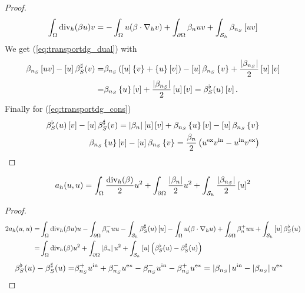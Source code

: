 \begin{proof}
%
\begin{align*}
\int_{\Omega}\operatorname{div}_h(\beta u) v = - \int_{\Omega}u (\beta\cdot\nabla_h v) + \int_{\partial\Omega} \beta_n uv + \int_{\mathcal S_h}\beta_{n_S} \left[uv\right]
\end{align*}
%
We get (\ref{eq:transportdg_dual}) with
%
\begin{align*}
\beta_{n_S} \left[uv\right] - \left[u\right] \beta_S^{\sharp}(v)
=&  \beta_{n_S} \left(\left[u\right]\left\{v\right\} + \left\{u\right\}\left[v\right]\right)- \left[u\right]\beta_{n_S}\left\{v\right\} + \frac{\left|\beta_{n_S}\right|}{2}\left[u\right]\left[v\right]\\
=&\beta_{n_S}\left\{u\right\}\left[v\right]+ \frac{\left|\beta_{n_S}\right|}{2}\left[u\right] \left[v\right]
=\beta_S^{\flat}(u) \left[v\right].
\end{align*}
%
Finally for (\ref{eq:transportdg_cons})
%
\begin{align*}
\beta_S^{\flat}(u) \left[v\right] - \left[u\right]\beta_S^{\sharp}(v) = \left|\beta_n\right|\left[u\right] \left[v\right]
+\beta_{n_S}\left\{u\right\}\left[v\right] -  \left[u\right]\beta_{n_S}\left\{v\right\}\\
\beta_{n_S}\left\{u\right\}\left[v\right] -  \left[u\right]\beta_{n_S}\left\{v\right\}=\frac{\beta_n}{2}\left({u}^{\rm ex}{v}^{\rm in}-{u}^{\rm in}{v}^{\rm ex}\right)
\end{align*}
%

\end{proof}
%
\begin{corollary}\label{cor:}
%
\begin{equation}\label{eq:}
a_h(u,u) = \int_{\Omega}\frac{\operatorname{div}_h(\beta)}{2} u^2 + \int_{\partial\Omega} \frac{\left|\beta_n\right|}{2} u^2+ \int_{\mathcal S_h}\frac{\left|\beta_{n_S}\right|}{2}\left[u\right]^2
\end{equation}
%
\end{corollary}
%
\begin{proof}
%
\begin{align*}
2a_h(u,u) =& \int_{\Omega}\operatorname{div}_h(\beta u) u - \int_{\partial\Omega} \beta_n^- uu - \int_{\mathcal S_h}\beta_S^{\sharp}(u) \left[u\right]
- \int_{\Omega}u (\beta\cdot\nabla_h u) + \int_{\partial\Omega} \beta_n^+ uu + \int_{\mathcal S_h}\left[u\right]\beta_S^{\flat}(u)\\
=&\int_{\Omega}\operatorname{div}_h(\beta) u^2 + \int_{\partial\Omega} \left|\beta_n\right| u^2+ \int_{\mathcal S_h}\left[u\right]\left(\beta_S^{\flat}(u)-\beta_S^{\sharp}(u)\right)
\end{align*}
%
%
\begin{align*}
\beta_S^{\flat}(u)-\beta_S^{\sharp}(u) =&  \beta_{n_S}^{+}{u}^{\rm in} + \beta_{n_S}^{-}{u}^{\rm ex} - \beta_{n_S}^{-}{u}^{\rm in} - \beta_{n_S}^{+}{u}^{\rm ex}= \left|\beta_{n_S}\right|{u}^{\rm in} - \left|\beta_{n_S}\right|{u}^{\rm ex}
\end{align*}
%
\end{proof}
%

